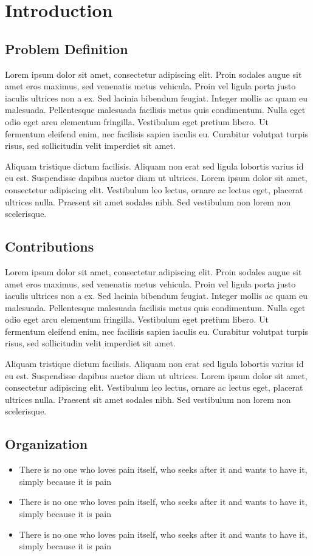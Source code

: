 \chapter{Introduction}
\label{chp:b1}

\section{Problem Definition}
 Lorem ipsum dolor sit amet, consectetur adipiscing elit. Proin sodales augue
 sit amet eros maximus, sed venenatis metus vehicula. Proin vel ligula porta
 justo iaculis ultrices non a ex. Sed lacinia bibendum feugiat. Integer mollis
 ac quam eu malesuada. Pellentesque malesuada facilisis metus quis condimentum.
 Nulla eget odio eget arcu elementum fringilla. Vestibulum eget pretium libero.
 Ut fermentum eleifend enim, nec facilisis sapien iaculis eu. Curabitur
 volutpat turpis risus, sed sollicitudin velit imperdiet sit amet.

Aliquam tristique dictum facilisis. Aliquam non erat sed ligula lobortis varius
id eu est. Suspendisse dapibus auctor diam ut ultrices. Lorem ipsum dolor sit
amet, consectetur adipiscing elit. Vestibulum leo lectus, ornare ac lectus
eget, placerat ultrices nulla. Praesent sit amet sodales nibh. Sed vestibulum
non lorem non scelerisque.

\section{Contributions}
Lorem ipsum dolor sit amet, consectetur adipiscing elit. Proin sodales augue
sit amet eros maximus, sed venenatis metus vehicula. Proin vel ligula porta
justo iaculis ultrices non a ex. Sed lacinia bibendum feugiat. Integer mollis
ac quam eu malesuada. Pellentesque malesuada facilisis metus quis condimentum.
Nulla eget odio eget arcu elementum fringilla. Vestibulum eget pretium libero.
Ut fermentum eleifend enim, nec facilisis sapien iaculis eu. Curabitur volutpat
turpis risus, sed sollicitudin velit imperdiet sit amet.

Aliquam tristique dictum facilisis. Aliquam non erat sed ligula lobortis varius
id eu est. Suspendisse dapibus auctor diam ut ultrices. Lorem ipsum dolor sit
amet, consectetur adipiscing elit. Vestibulum leo lectus, ornare ac lectus
eget, placerat ultrices nulla. Praesent sit amet sodales nibh. Sed vestibulum
non lorem non scelerisque.

\section{Organization}

\begin{itemize}
\item There is no one who loves pain itself, who seeks after it and wants to
    have it, simply because it is pain \item There is no one who loves pain
    itself, who seeks after it and wants to have it, simply because it is pain
\item There is no one who loves pain itself, who seeks after it and wants to
    have it, simply because it is pain
\end{itemize}
